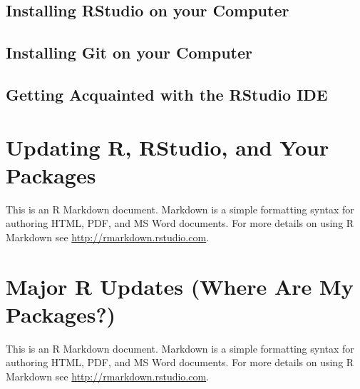 \documentclass[]{book}
\begin{document}
\hypertarget{installing-rstudio-on-your-computer}{%
\section{Installing RStudio on your Computer}\label{installing-rstudio-on-your-computer}}

\hypertarget{installing-git-on-your-computer}{%
\section{Installing Git on your Computer}\label{installing-git-on-your-computer}}

\hypertarget{getting-acquainted-with-the-rstudio-ide}{%
\section{Getting Acquainted with the RStudio IDE}\label{getting-acquainted-with-the-rstudio-ide}}

\hypertarget{updating-r-rstudio-and-your-packages}{%
\chapter{Updating R, RStudio, and Your Packages}\label{updating-r-rstudio-and-your-packages}}

This is an R Markdown document. Markdown is a simple formatting syntax for authoring HTML, PDF, and MS Word documents. For more details on using R Markdown see \url{http://rmarkdown.rstudio.com}.

\hypertarget{major-r-updates-where-are-my-packages}{%
\chapter{Major R Updates (Where Are My Packages?)}\label{major-r-updates-where-are-my-packages}}

This is an R Markdown document. Markdown is a simple formatting syntax for authoring HTML, PDF, and MS Word documents. For more details on using R Markdown see \url{http://rmarkdown.rstudio.com}.


\end{document}
